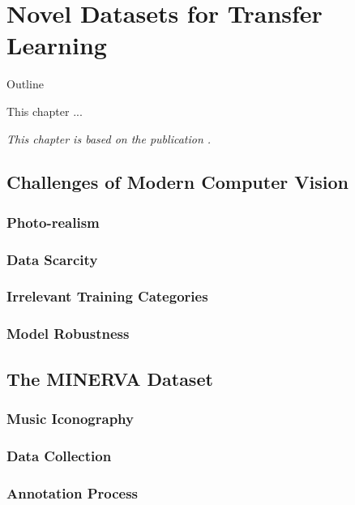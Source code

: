 \chapter{Novel Datasets for Transfer Learning}

\begin{remark}{Outline}

This chapter ...

\vspace{5mm}
\textit{This chapter is based on the publication \citet{sabatelli2021advances}.}
\label{ch:minerva_paper}


\end{remark}


\section{Challenges of Modern Computer Vision}
\label{sec:cv_challenges}


\subsection{Photo-realism}
\subsection{Data Scarcity}
\subsection{Irrelevant Training Categories}
\subsection{Model Robustness}



\section{The MINERVA Dataset}
\label{sec:minerva_dataset}

\subsection{Music Iconography}
\subsection{Data Collection}
\subsection{Annotation Process}
